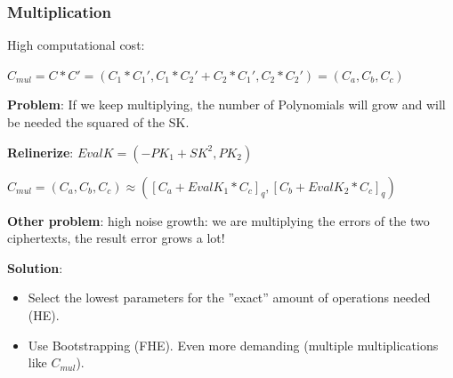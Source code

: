 \documentclass[10pt,handout]{beamer}
\begin{document}
\begin{frame}[noframenumbering]

    \frametitle{Multiplication}

    High computational cost:
    \vspace{-0.15cm}

    $C_{mul} = C*C' = (C_1*C_1',C_1*C_2'+C_2*C_1', C_2*C_2') = (C_a,C_b,C_c)$
    \vspace{-0.15cm}

    \textbf{Problem}: If we keep multiplying, the number of Polynomials will grow and will be needed
    the squared of the SK.

    \textbf{Relinerize}:
    $EvalK = (-PK_1+SK^2, PK_2)$

    $C_{mul} = (C_a, C_b, C_c)\approx ([C_a+EvalK_1*C_c]_q, [C_b+EvalK_2*C_c]_q)$

    \textbf{Other problem}: high noise growth: we are multiplying the errors of the two ciphertexts, the result error
    grows a lot!
    \vspace{-0.1cm}

    \textbf{Solution}: \vspace{-0.3cm}
    \begin{itemize} \vspace{-0.2cm}
        \item Select the lowest parameters for the ''exact'' amount  of operations needed (HE). \vspace{-0.2cm}
            \vspace{-0.25cm}
        \item Use Bootstrapping  (FHE). Even more demanding (multiple multiplications like $C_{mul}$).
    \end{itemize}
\end{frame}
\end{document}
